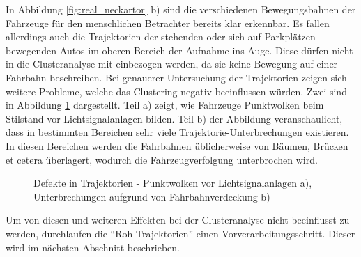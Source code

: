 In Abbildung \ref{fig:real_neckartor} b) sind die verschiedenen Bewegungsbahnen der Fahrzeuge für
den menschlichen Betrachter bereits klar erkennbar.
Es fallen allerdings auch die Trajektorien der stehenden oder sich auf Parkplätzen
bewegenden Autos im oberen Bereich der Aufnahme ins Auge. Diese dürfen nicht in die Clusteranalyse mit einbezogen werden,
da sie keine Bewegung auf einer Fahrbahn beschreiben.
Bei genauerer Untersuchung der Trajektorien zeigen sich weitere Probleme, welche das Clustering negativ
beeinflussen würden.
Zwei sind in Abbildung \ref{fig:real_defects_trajectories} dargestellt.
Teil a) zeigt, wie Fahrzeuge Punktwolken beim Stilstand vor Lichtsignalanlagen bilden.
Teil b) der Abbildung veranschaulicht, dass in bestimmten Bereichen sehr viele Trajektorie-Unterbrechungen
existieren. In diesen Bereichen werden die Fahrbahnen üblicherweise von Bäumen, Brücken et cetera überlagert, wodurch
die Fahrzeugverfolgung unterbrochen wird.

\begin{figure}[H]
    \centering
    \qquad
    \caption[Beispiel Defekte in Trajektoriedaten]{Defekte in Trajektorien - Punktwolken vor Lichtsignalanlagen a), Unterbrechungen aufgrund von Fahrbahnverdeckung b)}
    \label{fig:real_defects_trajectories}
\end{figure}

Um von diesen und weiteren Effekten bei der Clusteranalyse nicht beeinflusst zu werden, durchlaufen die
``Roh-Trajektorien'' einen Vorverarbeitungsschritt. Dieser wird im nächsten Abschnitt beschrieben.

